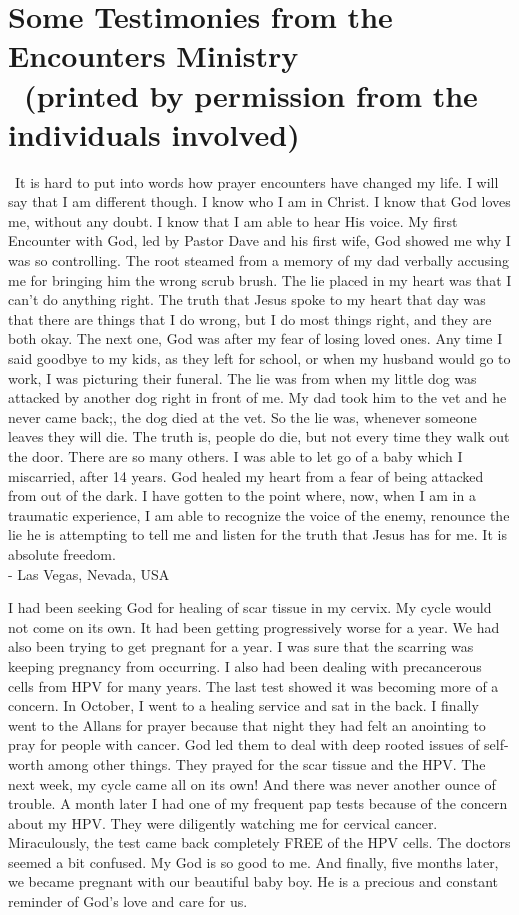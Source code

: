 \documentclass[oneside]{book}
\begin{document}
\chapter*{Some Testimonies from the Encounters Ministry\\
	\
	\small{(printed by permission from the individuals involved)}
}
\clearpage
\
It is hard to put into words how prayer encounters have changed my life. I will say that I am different though.  I know who I am in Christ. I know that God loves me, without any doubt.  I know that I am able to hear His voice.
My first Encounter with God, led by Pastor Dave and his first wife, God showed me why I was so controlling. The root steamed from a memory of my dad verbally accusing me for bringing him the wrong scrub brush. The lie placed in my heart was that I can't do anything right. The truth that Jesus spoke to my heart that day was that there are things that I do wrong, but I do most things right, and they are both okay.
The next one, God was after my fear of losing loved ones. Any time I said goodbye to my kids, as they left for school, or when my husband would go to work, I was picturing their funeral. The lie was from when my little dog was attacked by another dog right in front of me. My dad took him to the vet and he never came back;, the dog died at the vet. So the lie was, whenever someone leaves they will die. The truth is,  people do die, but not every time they walk out the door.
There are so many others.  I was able to let go of a baby which I miscarried, after 14 years.
God healed my heart from a fear of being attacked from out of the dark.
I have gotten to the point where, now, when I am in a traumatic experience,  I am able to recognize the voice of the enemy, renounce the lie he is attempting to tell me and listen for the truth that Jesus has for me. It is absolute  freedom. \\

- Las Vegas, Nevada, USA
\clearpage

I had been seeking God for healing of scar tissue in my cervix. My cycle would not come on its own. It had been getting progressively worse for a year. We had also been trying to get pregnant for a year. I was sure that the scarring was keeping pregnancy from occurring. I also had been dealing with precancerous cells from HPV for many years. The last test showed it was becoming more of a concern.
In October, I went to a healing service and sat in the back. I finally went to the Allans for prayer because that night they had felt an anointing to pray for people with cancer. God led them to deal with deep rooted issues of self-worth among other things. They prayed for the scar tissue and the HPV.
The next week, my cycle came all on its own! And there was never another ounce of trouble. A month later I had one of my frequent pap tests because of the concern about my HPV. They were diligently watching me for cervical cancer. Miraculously, the test came back  completely FREE of the HPV cells. The doctors seemed a bit confused. My God is so good to me.
And finally, five months later, we became pregnant with our beautiful baby boy. He is a precious and constant reminder of God’s love and care for us. \\
\end{document}
